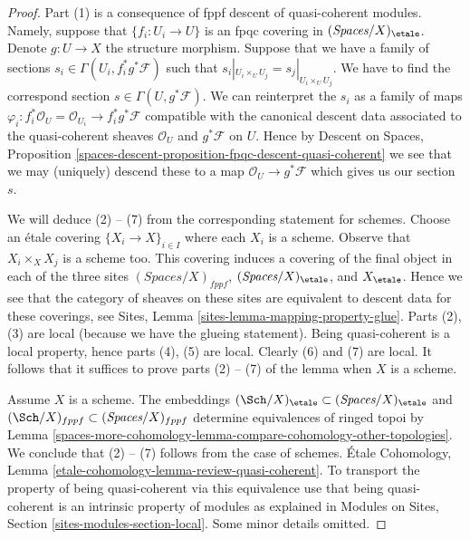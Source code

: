 \begin{proof}
Part (1) is a consequence of fppf descent of quasi-coherent modules.
Namely, suppose that $\{f_i : U_i \to U\}$ is an fpqc covering
in $(\textit{Spaces}/X)_\etale$. Denote $g : U \to X$ the structure
morphism. Suppose that
we have a family of sections $s_i \in \Gamma(U_i , f_i^*g^*\mathcal{F})$
such that $s_i|_{U_i \times_U U_j} = s_j|_{U_i \times_U U_j}$.
We have to find the correspond section $s \in \Gamma(U, g^*\mathcal{F})$.
We can reinterpret the $s_i$ as a family of maps
$\varphi_i : f_i^*\mathcal{O}_U = \mathcal{O}_{U_i} \to f_i^*g^*\mathcal{F}$
compatible with the canonical descent data associated to the
quasi-coherent sheaves $\mathcal{O}_U$ and $g^*\mathcal{F}$ on $U$.
Hence by Descent on Spaces, Proposition
\ref{spaces-descent-proposition-fpqc-descent-quasi-coherent}
we see that we may (uniquely) descend
these to a map $\mathcal{O}_U \to g^*\mathcal{F}$ which gives
us our section $s$.

\medskip\noindent
We will deduce (2) -- (7) from the corresponding statement for schemes.
Choose an \'etale covering $\{X_i \to X\}_{i \in I}$
where each $X_i$ is a scheme. Observe that $X_i \times_X X_j$
is a scheme too. This covering induces a covering of
the final object in each of the three sites
$(\textit{Spaces}/X)_{fppf}$, $(\textit{Spaces}/X)_\etale$, and $X_\etale$.
Hence we see that the category of sheaves on these sites
are equivalent to descent data for these coverings, see
Sites, Lemma \ref{sites-lemma-mapping-property-glue}.
Parts (2), (3) are local (because we have the glueing statement).
Being quasi-coherent is a local property, hence parts
(4), (5) are local. Clearly (6) and (7) are local.
It follows that it suffices to prove parts (2) -- (7)
of the lemma when $X$ is a scheme.

\medskip\noindent
Assume $X$ is a scheme. The embeddings
$(\Sch/X)_\etale \subset (\textit{Spaces}/X)_\etale$ and
$(\Sch/X)_{fppf} \subset (\textit{Spaces}/X)_{fppf}$
determine equivalences of ringed topoi by
Lemma \ref{spaces-more-cohomology-lemma-compare-cohomology-other-topologies}.
We conclude that (2) -- (7) follows from the case of schemes.
\'Etale Cohomology, Lemma
\ref{etale-cohomology-lemma-review-quasi-coherent}.
To transport the property of being quasi-coherent via
this equivalence use that being quasi-coherent is an
intrinsic property of modules as explained in
Modules on Sites, Section \ref{sites-modules-section-local}.
Some minor details omitted.
\end{proof}


